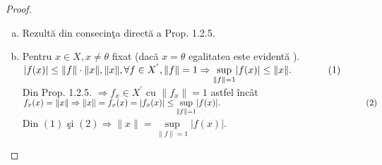 \documentclass[ a4paper, 12pt]{report}
\theoremstyle{remark}
\numberwithin{equation}{section}
\begin{document}
\begin{proof}
\begin{enumerate}[(a)]
\item Rezult\u a din consecin\c ta direct\u a a Prop. 1.2.5.
\item Pentru $x \in X, x \neq \theta$ fixat (dac\u a $x = \theta$ egalitatea este evident\u a ).\\
$\lvert f(x) \rvert \leq \lVert f \rVert \cdot \lVert x \rVert, \lVert x \rVert, \forall f \in X^{'}, \lVert f \rVert = 1 \Rightarrow \sup\limits_{\lVert f \rVert = 1} \lvert f(x) \rvert \leq \lVert x \rVert. \hspace{13mm} (1)$\\
Din Prop. 1.2.5. $\Rightarrow f_x \in X^{'}$ cu $\lVert f_x \rVert = 1$ astfel \^inc\^at $f_x(x) = \lVert  x \rVert \Rightarrow \lVert x \rVert = f_x(x) = \lvert f_x(x) \rvert \leq \sup\limits_{\lVert f \rVert = 1}\lvert f(x) \rvert.\hspace{59mm}(2)$\\
Din $(1)$ \c si $(2) \Rightarrow \lVert x \rVert = \sup\limits_{\lVert f \rVert = 1}\lvert f(x) \rvert.$
\end{enumerate}
\end{proof}
\end{document}
